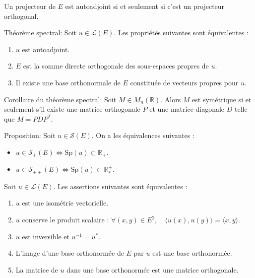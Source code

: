 \documentclass{article}
\begin{document}
\begin{itemize}[label=$\ast$]
\begin{center}
\item Un projecteur de $E$ est autoadjoint si et seulement si c'est un projecteur orthogonal.


\item Théorème spectral: Soit $u \in \mathcal{L}(E)$. Les propriétés suivantes sont équivalentes :
\begin{enumerate}
    \item $u$ est autoadjoint.
    \item $E$ est la somme directe orthogonale des sous-espaces propres de $u$.
    \item Il existe une base orthonormale de $E$ constituée de vecteurs propres pour $u$.
\end{enumerate}

\item Corollaire du théorème spectral: Soit $M \in M_n(\mathbb{R})$. Alors $M$ est symétrique si et seulement s'il existe une matrice orthogonale $P$ et une matrice diagonale $D$ telle que $M = PDP^T$.

\item Proposition: Soit $u \in \mathcal{S}(E)$. On a les équivalences suivantes :
\begin{itemize}
    \item $u \in \mathcal{S}_+(E) \iff \text{Sp}(u) \subset \mathbb{R}_+$.
    \item $u \in \mathcal{S}_{++}(E) \iff \text{Sp}(u) \subset \mathbb{R}_*^+$.
\end{itemize}

\item 
Soit $u \in \mathcal{L}(E)$. Les assertions suivantes sont équivalentes :
\begin{enumerate}
    \item $u$ est une isométrie vectorielle.
    \item $u$ conserve le produit scalaire : $\forall (x, y) \in E^2, \quad \langle u(x), u(y) \rangle = \langle x, y \rangle$.
    \item $u$ est inversible et $u^{-1} = u^*$.
    \item L'image d'une base orthonormée de $E$ par $u$ est une base orthonormée.
    \item La matrice de $u$ dans une base orthonormée est une matrice orthogonale.
\end{enumerate}


\end{center}
\end{itemize}
\end{document}
